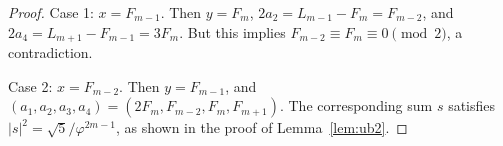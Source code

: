 \documentclass[10pt,a4paper]{amsart}
\newcommand{\ph}{\varphi}
\begin{document}
\begin{proof}
   Case 1:  $x=F_{m-1}$. Then  $y=F_{m}$, $2a_2=L_{m-1}-F_{m}=F_{m-2}$, and $2a_4=L_{m+1}-F_{m-1}=3F_{m}$. But this implies $F_{m-2}\equiv F_{m}\equiv 0\pmod{2}$, a contradiction.%
  
  Case 2: $x=F_{m-2}$. Then $y=F_{m-1}$, and  $(a_1,a_2,a_3,a_4)=(2F_{m},F_{m-2},F_m,F_{m+1})$. The corresponding sum $s$ satisfies $|s|^2=\sqrt{5}/\ph^{2m-1}$, as shown in the proof of Lemma~\ref{lem:ub2}.
\end{proof}
\end{document}

